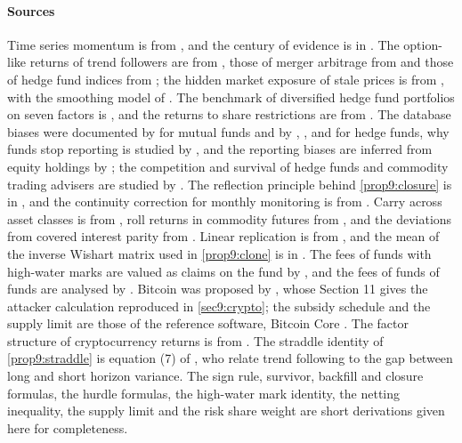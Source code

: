 \begin{chapterrefs}
\paragraph{Sources}
Time series momentum is from \textcite{moskowitz2012}, and the century of evidence is in
\textcite{hurst2017}. The option-like returns of trend followers are from \textcite{fung2001}, those of
merger arbitrage from \textcite{mitchell2001} and those of hedge fund indices from
\textcite{agarwal2004}; the hidden market exposure of stale prices is from \textcite{asness2001}, with the
smoothing model of \textcite{getmansky2004}. The benchmark of diversified hedge fund portfolios on
seven factors is \textcite{fung2004}, and the returns to share restrictions are from
\textcite{aragon2007}. The database biases were documented by
\textcite{brown1992} for mutual funds and by \textcite{fung2000}, \textcite{liang2000},
\textcite{ackermann1999} and \textcite{aiken2013} for hedge funds, why funds stop reporting is studied by
\textcite{grecu2007}, and the reporting biases are inferred from equity holdings by \textcite{agarwal2013}; the competition and survival of
hedge funds and commodity trading advisers are studied by \textcite{brown2001}. The reflection
principle behind \cref{prop9:closure} is in \textcite{shreve2004}, and the continuity correction for
monthly monitoring is from \textcite{broadie1997}. Carry across asset classes is from
\textcite{koijen2018}, roll returns in commodity futures from \textcite{erb2006}, and the deviations from
covered interest parity from \textcite{du2018}. Linear replication is
from \textcite{hasanhodzic2007}, and the mean of the inverse Wishart matrix used in \cref{prop9:clone}
is in \textcite{muirhead1982}. The fees of funds with high-water marks are valued as claims on the
fund by \textcite{goetzmann2003}, and the fees of funds of funds are analysed by \textcite{brown2003}.
Bitcoin was proposed by \textcite{nakamoto2008}, whose Section 11 gives the attacker calculation
reproduced in \cref{sec9:crypto}; the subsidy schedule and the supply limit are those of the reference
software, Bitcoin Core \parencite{bitcoincore}. The factor structure of cryptocurrency returns is
from \textcite{liu2021}. The straddle identity of \cref{prop9:straddle} is equation (7) of \textcite{dao2017}, who
relate trend following to the gap between long and short horizon variance. The sign rule, survivor,
backfill and closure formulas, the hurdle formulas, the
high-water mark identity, the netting inequality, the supply limit and the risk share weight are short
derivations given here for completeness.


\end{chapterrefs}
